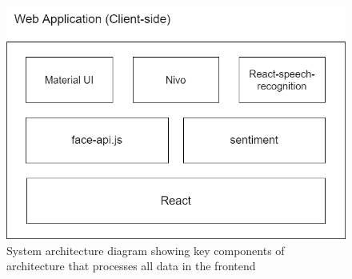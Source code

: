 \documentclass[12pt, a4paper]{article}
\begin{document}
\begin{appendices}
\begin{figure}[H]
    \centering
    \includegraphics[scale=0.50]{diagrams/sa2.png}
    \caption{System architecture diagram showing key components of architecture that processes all data in the frontend}
    \label{fig:allfe}
\end{figure}


\end{appendices}
\end{document}
